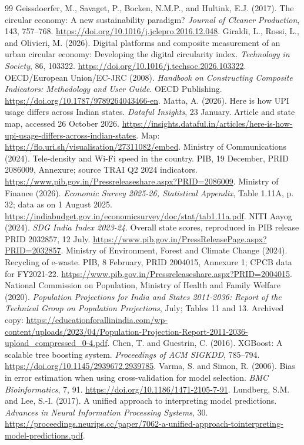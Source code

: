 \documentclass[11pt,a4paper]{article}
\begin{document}
\begin{thebibliography}{99}
 Geissdoerfer, M., Savaget, P., Bocken, N.M.P., and Hultink, E.J. (2017). The circular economy: A new sustainability paradigm? \textit{Journal of Cleaner Production}, 143, 757--768. \url{https://doi.org/10.1016/j.jclepro.2016.12.048}.
 Giraldi, L., Rossi, L., and Olivieri, M. (2026). Digital platforms and composite measurement of an urban circular economy: Developing the digital circularity index. \textit{Technology in Society}, 86, 103322. \url{https://doi.org/10.1016/j.techsoc.2026.103322}.
 OECD/European Union/EC-JRC (2008). \textit{Handbook on Constructing Composite Indicators: Methodology and User Guide}. OECD Publishing. \url{https://doi.org/10.1787/9789264043466-en}.
 Matta, A. (2026). Here is how UPI usage differs across Indian states. \textit{Dataful Insights}, 23 January. Article and state map, accessed 26 October 2026. \url{https://insights.dataful.in/articles/here-is-how-upi-usage-differs-across-indian-states}. Map: \url{https://flo.uri.sh/visualisation/27311082/embed}.
 Ministry of Communications (2024). Tele-density and Wi-Fi speed in the country. PIB, 19 December, PRID 2086009, Annexure; source TRAI Q2 2024 indicators. \url{https://www.pib.gov.in/Pressreleaseshare.aspx?PRID=2086009}.
 Ministry of Finance (2026). \textit{Economic Survey 2025-26, Statistical Appendix}, Table 1.11A, p. 32; data as on 1 August 2025. \url{https://indiabudget.gov.in/economicsurvey/doc/stat/tab1.11a.pdf}.
 NITI Aayog (2024). \textit{SDG India Index 2023-24}. Overall state scores, reproduced in PIB release PRID 2032857, 12 July. \url{https://www.pib.gov.in/PressReleasePage.aspx?PRID=2032857}.
 Ministry of Environment, Forest and Climate Change (2024). Recycling of e-waste. PIB, 8 February, PRID 2004015, Annexure 1; CPCB data for FY2021-22. \url{https://www.pib.gov.in/Pressreleaseshare.aspx?PRID=2004015}.
 National Commission on Population, Ministry of Health and Family Welfare (2020). \textit{Population Projections for India and States 2011-2036: Report of the Technical Group on Population Projections}, July; Tables 11 and 13. Archived copy: \url{https://educationforallinindia.com/wp-content/uploads/2023/04/Population-Projection-Report-2011-2036-upload_compressed_0-4.pdf}.
 Chen, T. and Guestrin, C. (2016). XGBoost: A scalable tree boosting system. \textit{Proceedings of ACM SIGKDD}, 785--794. \url{https://doi.org/10.1145/2939672.2939785}.
 Varma, S. and Simon, R. (2006). Bias in error estimation when using cross-validation for model selection. \textit{BMC Bioinformatics}, 7, 91. \url{https://doi.org/10.1186/1471-2105-7-91}.
 Lundberg, S.M. and Lee, S.-I. (2017). A unified approach to interpreting model predictions. \textit{Advances in Neural Information Processing Systems}, 30. \url{https://proceedings.neurips.cc/paper/7062-a-unified-approach-tointerpreting-model-predictions.pdf}.
\end{thebibliography}
\end{document}
